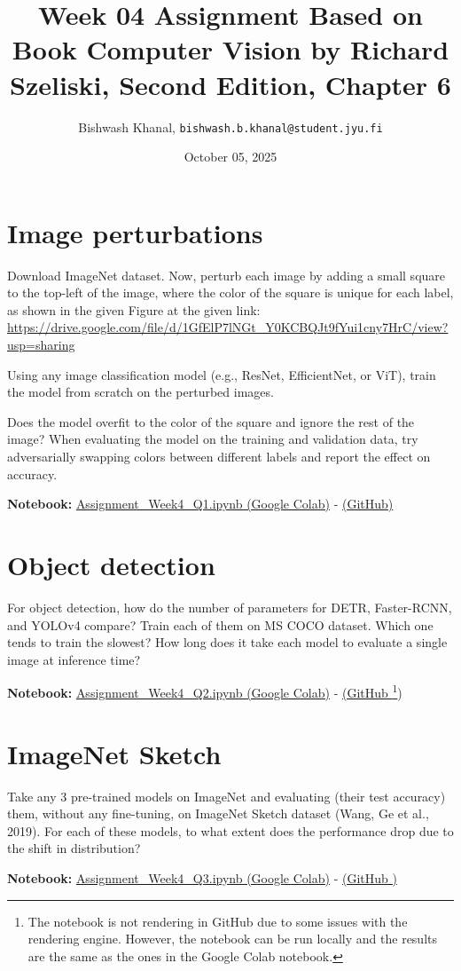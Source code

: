 \documentclass[12pt,a4paper]{article}
\title{Week 04 Assignment Based on Book Computer Vision by Richard Szeliski, Second Edition, Chapter 6}
\author{Bishwash Khanal, \texttt{bishwash.b.khanal@student.jyu.fi}}
\date{October 05, 2025}
\begin{document}
\maketitle

\section{Image perturbations}
Download ImageNet dataset. Now, perturb each image by adding a small square to the top-left of the image, where the color of the square is unique for 
each label, as shown in the given Figure at the given link: \url{https://drive.google.com/file/d/1GfElP7lNGt_Y0KCBQJt9fYui1cny7HrC/view?usp=sharing}


Using any image classification model (e.g., ResNet, EfficientNet, or ViT), train the model from scratch on the perturbed images.


Does the model overfit to the color of the square and ignore the rest of the image? When evaluating the model on the training and validation data, 
try adversarially swapping colors between different labels and report the effect on accuracy.

\textbf{Notebook:} \href{https://colab.research.google.com/drive/1own6DpmdM8Nlx5oqRM8h9s4naU_R6tED?usp=sharing}{Assignment\_Week4\_Q1.ipynb (Google Colab)} - 
\href{https://github.com/bkhanal-11/ties411_cvip_jyu/blob/master/assignment4/src/Assignment_Week4_Q1.ipynb}{(GitHub)}


\section{Object detection}
For object detection, how do the number of parameters for DETR, Faster-RCNN, and YOLOv4 compare? Train each of them on MS COCO dataset. 
Which one tends to train the slowest? How long does it take each model to evaluate a single image at inference time?

\textbf{Notebook:} \href{https://colab.research.google.com/drive/15lZexKpMhi8YTQSRUhzudx96gLgtdNkc?usp=sharing}{Assignment\_Week4\_Q2.ipynb (Google Colab)} - 
\href{https://github.com/bkhanal-11/ties411_cvip_jyu/blob/master/assignment4/src/Assignment_Week4_Q2.ipynb}{(GitHub \footnote{The notebook is not rendering in GitHub due to some issues with the rendering engine. However, the notebook can be run locally and the results are the same as the ones in the Google Colab notebook.})}

\section{ImageNet Sketch}
Take any 3 pre-trained models on ImageNet and evaluating (their test accuracy) them, without any fine-tuning, on ImageNet Sketch dataset 
(Wang, Ge et al., 2019). For each of these models, to what extent does the performance drop due to the shift in distribution?

\textbf{Notebook:} \href{https://colab.research.google.com/drive/1iXdk22CjFKFREb8IFVXQX4Lbwdluaqp-?usp=sharing}{Assignment\_Week4\_Q3.ipynb (Google Colab)} - 
\href{https://github.com/bkhanal-11/ties411_cvip_jyu/blob/master/assignment4/src/Assignment_Week4_Q3.ipynb}{(GitHub \footnotemark[1])}
\end{document}
